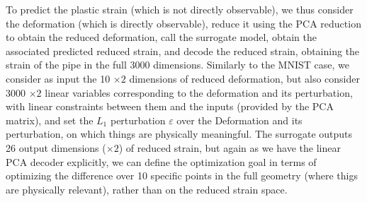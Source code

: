 To predict the plastic strain (which is not directly observable), we thus consider the deformation (which is directly observable), reduce it using the PCA reduction to obtain the reduced deformation, call the surrogate model, obtain the associated predicted reduced strain, and decode the reduced strain, obtaining the strain of the pipe in the full 3000 dimensions. Similarly to the MNIST case, we consider as input the 10 $\times 2$ dimensions of reduced deformation, but also consider 3000 $\times 2$ linear variables corresponding to the deformation and its perturbation, with linear constraints between them and the inputs (provided by the PCA matrix), and set the $L_1$ perturbation $\varepsilon$ over the Deformation and its perturbation, on which things are physically meaningful.
The surrogate outputs 26 output dimensions ($\times 2$) of reduced strain, but again 
as we have the linear PCA decoder explicitly, we can define the optimization goal 
in terms of optimizing the difference over 10 specific points in the full geometry (where thigs are physically relevant), rather than on the reduced strain space.

\newpage

